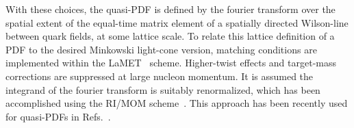 
With these choices, the quasi-PDF is defined by the fourier transform over the spatial extent of the equal-time matrix element of a spatially directed Wilson-line between quark fields, at some lattice scale. To relate this lattice definition of a PDF to the desired Minkowski light-cone version, matching conditions are implemented within the LaMET~\cite{Ji:2013dva,Ji:2014gla} scheme. Higher-twist effects and target-mass corrections are suppressed at large nucleon momentum. It is assumed the integrand of the fourier transform is suitably renormalized, which has been accomplished using the RI/MOM scheme~\cite{Martinelli:1994ty}. This approach has been recently used  for quasi-PDFs  in Refs.~\cite{Alexandrou:2017huk,Chen:2017mzz,Green:2017xeu}.


